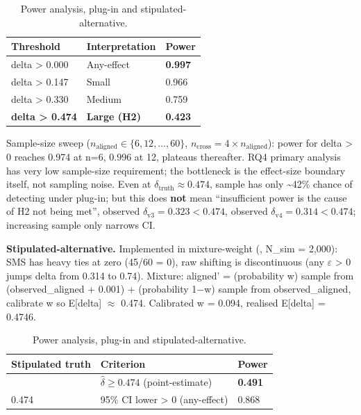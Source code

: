 \documentclass[manuscript,screen,review]{acmart}
\begin{document}
{%
\begin{longtable}[]{@{}lll@{}}
\caption{Power analysis, plug-in and stipulated-alternative.}\label{tab:p2-23}\\
\toprule\noalign{}
Threshold & Interpretation & Power \\
\midrule\noalign{}
\endfirsthead
\endhead
\bottomrule\noalign{}
\endlastfoot
delta \textgreater{} 0.000 & Any-effect & \textbf{0.997} \\
delta \textgreater{} 0.147 & Small & 0.966 \\
delta \textgreater{} 0.330 & Medium & 0.759 \\
\textbf{delta \textgreater{} 0.474} & \textbf{Large (H2)} &
\textbf{0.423} \\
\end{longtable}
}

Sample-size sweep ($n_{\mathrm{aligned}} \in \{6, 12, \ldots, 60\}$, $n_{\mathrm{cross}} = 4 \times n_{\mathrm{aligned}}$):
power for delta \textgreater{} 0 reaches 0.974 at n=6, 0.996 at 12,
plateaus thereafter. RQ4 primary analysis has very low sample-size
requirement; the bottleneck is the effect-size boundary itself, not
sampling noise. Even at $\delta_{\mathrm{truth}} \approx 0.474$, sample has only
\textasciitilde42\% chance of detecting under plug-in; but this does
\textbf{not} mean ``insufficient power is the cause of H2 not being
met'', observed $\delta_{\mathrm{v3}} = 0.323 < 0.474$, observed
$\delta_{\mathrm{v4}} = 0.314 < 0.474$; increasing sample only narrows CI.

\textbf{Stipulated-alternative.} Implemented in
mixture-weight (,
N\_sim = 2,000): SMS has heavy ties at zero (45/60 = 0), raw shifting is
discontinuous (any $\varepsilon$ \textgreater{} 0 jumps delta from 0.314 to 0.74).
Mixture: aligned' = (probability w) sample from (observed\_aligned +
0.001) + (probability 1$-$w) sample from observed\_aligned, calibrate w so
E{[}delta{]} $\approx$ 0.474. Calibrated w = 0.094, realised E{[}delta{]} =
0.4746.

{%
\begin{longtable}[]{@{}lll@{}}
\caption{Power analysis, plug-in and stipulated-alternative.}\label{tab:p2-24}\\
\toprule\noalign{}
Stipulated truth & Criterion & Power \\
\midrule\noalign{}
\endfirsthead
\endhead
\bottomrule\noalign{}
\endlastfoot
0.474 & $\hat{\delta} \geq 0.474$ (point-estimate) & \textbf{0.491} \\
0.474 & 95\% CI lower \textgreater{} 0 (any-effect) & 0.868 \\
\end{longtable}
}
\end{document}
